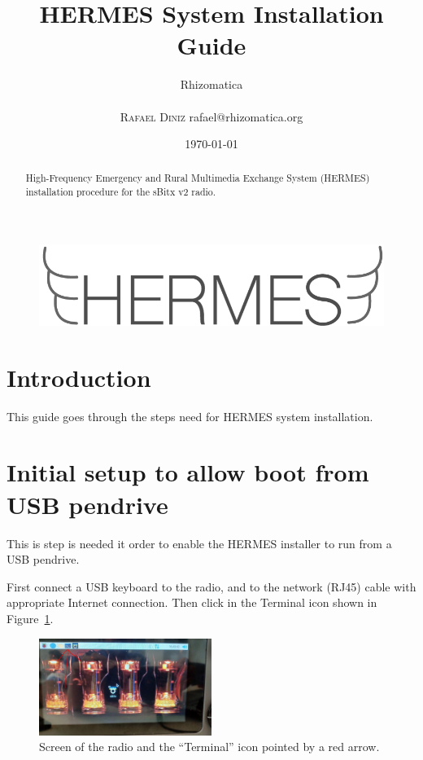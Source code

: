 \documentclass[11pt,a4paper]{article}
\title{HERMES System Installation Guide}
\author{
       \large
       \mbox{Rhizomatica} \\
       \mbox{}\\ 
       \textsc{Rafael Diniz}
        rafael@rhizomatica.org\\
}
\date{\today}
\begin{document}
\maketitle

\begin{figure}[!ht]
\includegraphics[width=1\textwidth]{pictures/logoh.png}
\end{figure}

\begin{abstract}

  High-Frequency Emergency and Rural Multimedia Exchange System (HERMES) installation procedure for the sBitx v2 radio.

\end{abstract}


\tableofcontents

\setlength{\parindent}{0em}
\setlength{\parskip}{1em}

\section{Introduction}

This guide goes through the steps need for HERMES system installation.


\section{Initial setup to allow boot from USB pendrive}

This is step is needed it order to enable the HERMES installer to run from a USB pendrive.

First connect a USB keyboard to the radio, and to the network (RJ45) cable with appropriate Internet connection.
Then click in the Terminal icon shown in Figure~\ref{fig:terminal}.

\begin{figure}[!ht]
  \centering
  \includegraphics[width=0.5\textwidth]{pictures/screen1-edited.jpeg}
  \caption{Screen of the radio and the ``Terminal'' icon pointed by a red arrow.}
  \label{fig:terminal}
\end{figure}
\end{document}
